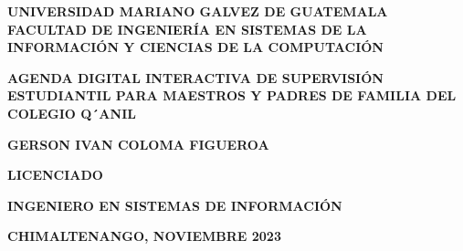 \begin{titlepage}
	\begin{center}
		{\Large \textbf{UNIVERSIDAD MARIANO GALVEZ DE GUATEMALA}}
		{\Large \textbf{FACULTAD DE INGENIERÍA EN SISTEMAS DE LA INFORMACIÓN Y CIENCIAS DE LA COMPUTACIÓN}}
		
		{\vspace{25mm}\Large \textbf{AGENDA DIGITAL INTERACTIVA DE SUPERVISIÓN ESTUDIANTIL PARA MAESTROS Y PADRES DE FAMILIA DEL COLEGIO Q´ANIL}}
		
		{\vspace{35mm}\Large {}}
		
		{\vspace{3mm}\Large \textbf{GERSON IVAN COLOMA FIGUEROA}}
		
		{\vspace{3mm}\Large{}}
		
		{\vspace{3mm}\Large\textbf{LICENCIADO}}
		
		{\vspace{3mm}\Large {}}
		
		{\vspace{3mm}\Large\textbf{INGENIERO EN SISTEMAS DE INFORMACIÓN}}
		
		{\vspace{105mm}\Large\textbf{CHIMALTENANGO, NOVIEMBRE 2023}}
		
		
	\end{center}
\end{titlepage}
